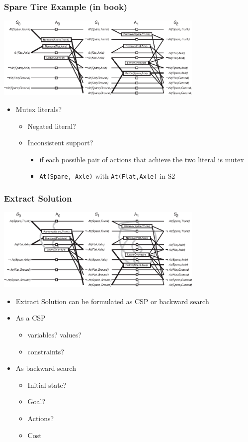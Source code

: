 \documentclass[compress, 9pt]{beamer}
\begin{document}
\begin{frame}
\frametitle{Spare Tire Example (in book)}
\label{sec-3-4}

\includegraphics[width=10cm]{../images/tire-graphplan2-no-mutex.eps}
\begin{itemize}
\item <1-> Mutex literals?
\begin{itemize}
\item <1-> Negated literal?
\item <2-> Inconsistent support?
\begin{itemize}
\item <3-> if each possible pair of actions that achieve the two
      literal is mutex
\item <4-> \texttt{At(Spare, Axle)} with \texttt{At(Flat,Axle)} in S2
\end{itemize}
\end{itemize}
\end{itemize}
\end{frame}
\begin{frame}
\frametitle{Extract Solution}
\label{sec-3-5}

\includegraphics[width=10cm]{../images/tire-graphplan2.eps}
\begin{itemize}

\item Extract Solution can be formulated as CSP or backward search
\label{sec-3-5-1}%

\item As a CSP
\label{sec-3-5-2}%
\begin{itemize}
\item variables? values?
\item constraints?
\end{itemize}

\item As backward search
\label{sec-3-5-3}%
\begin{itemize}
\item Initial state?
\item Goal?
\item Actions?
\item Cost
\end{itemize}

\end{itemize} %
\end{frame}
\end{document}

